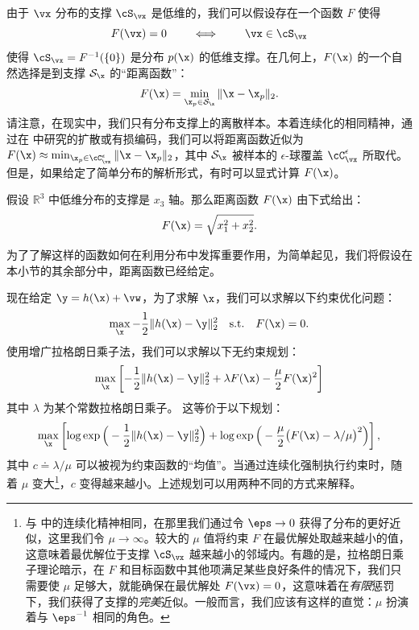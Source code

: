 \documentclass[../../book-main_zh.tex]{subfiles}
\begin{document}
由于 \(\vx\) 分布的支撑 \(\cS_{\vx}\) 是低维的，我们可以假设存在一个函数 \(F\) 使得
\begin{equation}
    F(\vx) = {0} \qquad \iff \qquad \vx \in \cS_{\vx}
\end{equation}
使得 \(\cS_{\vx} = F^{-1}(\{0\})\) 是分布 $p(\x)$ 的低维支撑。在几何上，$F(\x)$ 的一个自然选择是到支撑 $\mathcal{S}_{\x}$ 的“距离函数”：
\begin{equation}
    F(\x) = \min_{\x_p \in \mathcal{S}_{\x}} \|\x - \x_p\|_2.
    \label{eqn:F-definition}
\end{equation}
请注意，在现实中，我们只有分布支撑上的离散样本。本着连续化的相同精神，通过在  中研究的扩散或有损编码，我们可以将距离函数近似为 $F(\x) \approx \min_{\x_p \in \cC_{\vx}^{\epsilon}} \|\x
- \x_p\|_2$，其中 $\mathcal{S}_{\x}$ 被样本的 $\epsilon$-球覆盖 \(\cC_{\vx}^{\epsilon}\) 所取代。但是，如果给定了简单分布的解析形式，有时可以显式计算 $F(\x)$。
\begin{example}
    假设 $\mathbb{R}^3$ 中低维分布的支撑是 $x_3$ 轴。那么距离函数 $F(\x)$ 由下式给出：
    \begin{equation}
        F(\x) = \sqrt{x_1^2 + x_2^2}.
    \end{equation}
    \label{eg:distance-line}
\end{example}
为了了解这样的函数如何在利用分布中发挥重要作用，为简单起见，我们将假设在本小节的其余部分中，距离函数已经给定。

现在给定 $\y = h(\x) +\vw$，为了求解 $\x$，我们可以求解以下约束优化问题：
\begin{equation}
    \max_{\x} - \frac{1}{2}\|h(\x) - \y\|_2^2 \quad \mbox{s.t.} \quad
    F(\x) = {0}.
\end{equation}
使用增广拉格朗日乘子法，我们可以求解以下无约束规划：
\begin{equation}
    \max_{\x} \left[-\frac{1}{2}\|h(\x) - \y\|_2^2  + \lambda F(\x) -
    \frac{\mu}{2} F(\x)^2\right]
\end{equation}
其中 $\lambda$ 为某个常数拉格朗日乘子。
这等价于以下规划：
\begin{equation}\label{eq:lagrange_multiplier_continuation}
    \max_{\x} \left[\log \exp\Big(- \frac{1}{2}\|h(\x) -
        \y\|_2^2\Big) + \log \exp\Big( - \frac{\mu}{2} \big(F(\x) -
    \lambda/\mu\big)^2\Big)\right],
\end{equation}
其中 $c \doteq {\lambda}/{\mu}$ 可以被视为约束函数的“均值”。当通过连续化强制执行约束时，随着 $\mu$ 变大\footnote{与  中的连续化精神相同，在那里我们通过令 \(\eps \to 0\) 获得了分布的更好近似，这里我们令 \(\mu \to \infty\)。较大的 \(\mu\) 值将约束 \(F\) 在最优解处取越来越小的值，这意味着最优解位于支撑 \(\cS_{\vx}\) 越来越小的邻域内。有趣的是，拉格朗日乘子理论暗示，在 \(F\) 和目标函数中其他项满足某些良好条件的情况下，我们只需要使 \(\mu\) 足够大，就能确保在最优解处 \(F(\vx) = 0\)，这意味着在\textit{有限}惩罚下，我们获得了支撑的\textit{完美}近似。一般而言，我们应该有这样的直觉：\(\mu\) 扮演着与 \(\eps^{-1}\) 相同的角色。}，$c$ 变得越来越小。上述规划可以用两种不同的方式来解释。
\end{document}
